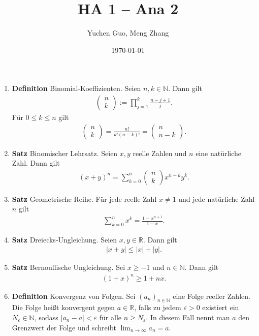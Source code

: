 \documentclass[draft,a5paper]{article}
\author{Yuchen Guo, Meng Zhang}
\date{\today}
\title{HA 1 -- Ana 2}
\newcommand{\mg}[1]{\mathbb{#1}}
\newcommand{\defn}[1]{\item \textbf{Definition} #1.}
\newcommand{\satz}[1]{\item \textbf{Satz} #1.}
\begin{document}
\begin{enumerate}

\defn{Binomial-Koeffizienten}  Seien \(n, k \in \mg{N}\).
Dann gilt
\begin{align*}
\begin{pmatrix}
n \\ k
\end{pmatrix} :=
  \prod_{j = 1}^k{\frac{n-j+1}{j}}.
\end{align*}
Für \(0 \le k \le n\) gilt
\begin{align*}
\begin{pmatrix}
n \\ k
\end{pmatrix} = \frac{n!}{k! (n-k)!} =
\begin{pmatrix}
n \\ n - k
\end{pmatrix}.
\end{align*}

\satz{Binomischer Lehrsatz}  Seien \(x, y\) reelle Zahlen
und \(n\) eine natürliche Zahl.  Dann gilt
\begin{align*}
(x+y)^n = \sum_{k=0}^n{
\begin{pmatrix}
n \\ k
\end{pmatrix} x^{n-k}y^k
}.
\end{align*}

\satz{Geometrische Reihe}  Für jede reelle Zahl $x \ne
1$ und jede natürliche Zahl \(n\) gilt
\begin{align*}
\sum_{k=0}^n{x^k} = \frac{1-x^{n+1}}{1-x}.
\end{align*}

\satz{Dreiecks-Ungleichung}  Seien \(x, y \in \mg{R}\).
Dann gilt
\begin{align*}
\left| x + y \right| \le \left| x \right| + \left| y \right|.
\end{align*}

\satz{Bernoullische Ungleichung} Sei \(x \ge -1\) und
\(n \in \mg{N}\).  Dann gilt
\begin{align*}
(1+x)^n \ge 1 + nx.
\end{align*}

\defn{Konvergenz von Folgen} Sei \((a_n)_{n \in \mg{N}}\)
eine Folge reeller Zahlen.  Die Folge heißt konvergent
gegen \(a \in \mg{R}\), falls zu jedem \(\varepsilon > 0\)
existiert ein \(N_{\varepsilon} \in \mg{N}\), sodass
\(\left| a_n - a \right| < \varepsilon\) für alle
\(n \ge N_{\varepsilon}\).  In diesem Fall nennt man \(a\)
den Grenzwert der Folge und schreibt
\(\lim_{n \to \infty}{a_n} = a\).


\end{enumerate}
\end{document}
